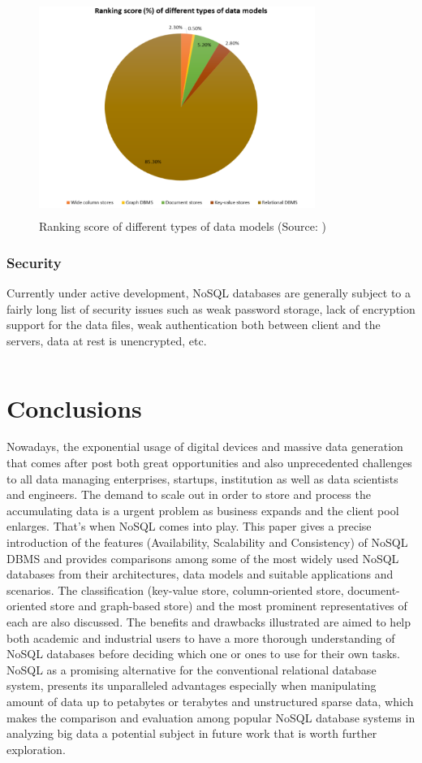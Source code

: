 \begin{figure}[H]
	\includegraphics[height=7cm, width=9cm]{../../../images/rank.png}
	\caption{Ranking score of different types of data models (Source: \cite{DBLP:journals/corr/Sharma15b})}
\end{figure}


\subsubsection{Security}\mbox{}

\noindent Currently under active development,
NoSQL databases are generally subject to a fairly long list of security issues \cite{deka2014handbook} such as weak password storage, lack of encryption support for the data files, weak authentication both between client and the servers, data at rest is unencrypted, etc.

\[\]

\section{Conclusions}

Nowadays, the exponential usage of digital devices and massive data generation that comes after post both great opportunities and also unprecedented challenges to all data managing enterprises, startups, institution as well as data scientists and engineers.
The demand to scale out in order to store and process the accumulating data is a urgent problem as business expands and the client pool enlarges. That's when NoSQL comes into play. This paper gives a precise introduction of the  features (Availability, Scalability and Consistency) of NoSQL DBMS and provides comparisons among some of the most widely used NoSQL databases from their architectures, data models and suitable applications and scenarios. The classification (key-value store, column-oriented store, document-oriented store and graph-based store) and the most prominent representatives of each are also discussed. The benefits and drawbacks illustrated are aimed to help both academic and industrial users to have a more thorough understanding of NoSQL databases before deciding which one or ones to use for their own tasks. NoSQL as a promising alternative for the conventional relational database system, presents its unparalleled advantages especially when manipulating amount of data up to petabytes or terabytes and unstructured sparse data, which makes the comparison and evaluation among popular NoSQL database systems in analyzing big data a potential subject in future work that is worth further exploration. 

\[\]
